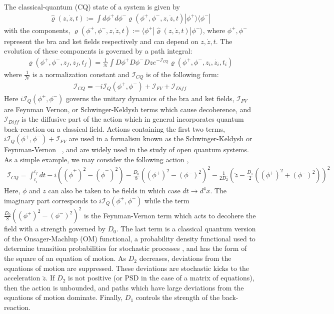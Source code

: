 \documentclass[aps,preprintnumbers,superscriptaddress,longbibliography]{revtex4-1}
\begin{document}
The classical-quantum (CQ) state of a system is given by
\begin{align}
    \hat{\varrho}(z,\dot z,t):=\int d\phi^+ d\phi^-  \varrho(\phi^+,\phi^-,z,\dot z,t)|\phi^+\rangle\langle\phi^-|
\end{align}
with the components, $\varrho(\phi^+,\phi^-,z,\dot z,t):=\langle\phi^+|\hat{\varrho}(z,\dot z,t)|\phi^-\rangle$, where $\phi^+,\phi^-$ represent the bra and ket fields respectively and can depend on $z,\dot z,t$.  The evolution of these components is governed by a path integral:
\begin{align}
 \varrho(\phi^{+},\phi^{-},z_f,\dot{z_f},t_f)= \frac{1}{\mathcal{N}} \int D\phi^{+}D\phi^{-}Dz e^{-\mathcal{I}_{CQ}}\varrho(\phi^{+},\phi^{-},z_i,\dot{z_i},t_i)
\end{align}
where $\frac{1}{\mathcal{N}}$ is a normalization constant and $\mathcal{I}_{CQ}$ is of the following form:
\begin{align}
 \mathcal{I}_{CQ}=-i\mathcal{I}_Q(\phi^+,\phi^-)+\mathcal{I}_{FV}+\mathcal{I}_{Diff}  
\end{align}
Here $i\mathcal{I}_Q(\phi^+,\phi^-)$ governs the unitary dynamics of the bra and ket fields, $\mathcal{I}_{FV}$ are Feynman Vernon, or Schwinger-Keldysh terms which cause decoherence, and $\mathcal{I}_{Diff}$ is the diffusive part of the action which in general incorporates  quantum back-reaction on a classical field. Actions containing the first two terms, $i\mathcal{I}_Q(\phi^+,\phi^-)+\mathcal{I}_{FV}$ are used in a formalism known as the Schwinger-Keldysh or Feynman-Vernon  ~\cite{feynman1963theory}, and are widely used in the study of open quantum systems.  As a simple example, we may consider the following action \cite{grudka2024renormalisation},
\begin{align}
    \mathcal{I}_{CQ}=\int^{t_f}_{t_i} dt-i((\dot\phi^+)^2-(\dot\phi^-)^2)-\frac{D_0}{8}((\phi^+)^2-(\phi^-)^2)^2-\frac{1}{2D_2}(\ddot{z}-\frac{D_1}{2}((\phi^+)^2+(\phi^-)^2))^2
\end{align}
Here, $\phi$ and $z$ can also be taken to be fields in which case $dt\rightarrow d^4x$. The imaginary part corresponds to $i\mathcal{I}_Q(\phi^+,\phi^-)$ while the term $\frac{D_0}{8}((\phi^+)^2-(\phi^-)^2)^2$ is the Feynman-Vernon term which acts to decohere the field with a strength governed by $D_0$. The last term is a classical quantum version of the Onsager-Machlup (OM) functional, a probability density functional used to determine transition probabilities for stochastic processes \cite{onsager1953fluctuations},  \cite{Chaichian2018PathI} and has the form of the square of an equation of motion.  As $D_2$ decreases, deviations from the equations of motion are suppressed. These deviations are stochastic kicks to the acceleration $\ddot{z}$. If $D_2$ is not positive (or PSD in the case of a matrix of equations), then the action is unbounded, and paths which have large deviations from the equations of motion dominate. Finally, $D_1$ controls the strength of the back-reaction.
\end{document}
